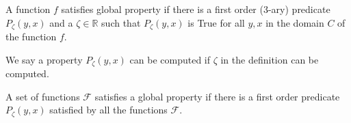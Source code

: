 	\begin{definition}
		A function $f$ satisfies global property if there is a first order (3-ary) predicate $P_{\zeta}(y,x)$ and a $\zeta \in \mathbb{R}$ such that $P_{\zeta}(y,x)$ is True for all $y,x$ in the domain $C$ of the function $f$.
	\end{definition}
	
	We say a property $P_{\zeta}(y,x)$ can be computed if $\zeta$ in the definition can be computed.
	
	\begin{definition}
		A set of functions $\mathcal{F}$ satisfies a global property if there is a first order predicate $P_{\zeta}(y,x)$ satisfied by all the functions $\mathcal{F}$.%
	\end{definition}
	
	
	
